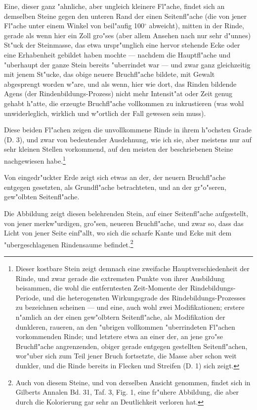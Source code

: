 \documentclass[a4paper, 11pt, oneside, german]{article}
\begin{document}
Eine, dieser ganz "ahnliche, aber ungleich kleinere Fl"ache, findet sich an demselben Steine gegen den unteren Rand der einen Seitenfl"ache (die von jener Fl"ache unter einem Winkel von beil"aufig 100$^{\circ}$ abweicht), mitten in der Rinde, gerade als wenn hier ein Zoll gro"ses (aber allem Ansehen nach nur sehr d"unnes) St"uck der Steinmasse, das etwa urspr"unglich eine hervor stehende Ecke oder eine Erhabenheit gebildet haben mochte --- nachdem die Hauptfl"ache und "uberhaupt der ganze Stein bereits "uberrindet war --- und zwar ganz gleichzeitig mit jenem St"ucke, das obige neuere Bruchfl"ache bildete, mit Gewalt abgesprengt worden w"are, und als wenn, hier wie dort, das Rinden bildende Agens (der Rindenbildungs-Prozess) nicht mehr Intensit"at oder Zeit genug gehabt h"atte, die erzeugte Bruchfl"ache vollkommen zu inkrustieren (was wohl unwiderleglich, wirklich und w"ortlich der Fall gewesen sein muss).

Diese beiden Fl"achen zeigen die unvollkommene Rinde in ihrem h"ochsten Grade (D. 3), und zwar von bedeutender Ausdehnung, wie ich sie, aber meistens nur auf sehr kleinen Stellen vorkommend, auf den meisten der beschriebenen Steine nachgewiesen habe.\footnote{Dieser kostbare Stein zeigt demnach eine zweifache Hauptverschiedenheit der Rinde, und zwar gerade die extremsten Punkte von ihrer Ausbildung beisammen, die wohl die entferntesten Zeit-Momente der Rindebildungs-Periode, und die heterogensten Wirkungsgrade des Rindebildungs-Prozesses zu bezeichnen scheinen --- und eine, auch wohl zwei Modifikationen; erstere n"amlich an der einen gew"olbtern Seitenfl"ache, als Modifikation der dunkleren, raueren, an den "ubrigen vollkommen "uberrindeten Fl"achen vorkommenden Rinde; und letztere etwa an einer der, an jene gro"se Bruchfl"ache angrenzenden, obiger gerade entgegen gestellten Seitenfl"achen, wor"uber sich zum Teil jener Bruch fortsetzte, die Masse aber schon weit dunkler, und die Rinde bereits in Flecken und Streifen (D. 1) sich zeigt.}

Von eingedr"uckter Erde zeigt sich etwas an der, der neuern Bruchfl"ache entgegen gesetzten, als Grundfl"ache betrachteten, und an der gr"o"seren, gew"olbten Seitenfl"ache.

Die Abbildung zeigt diesen belehrenden Stein, auf einer Seitenfl"ache aufgestellt, von jener merkw"urdigen, gro"sen, neueren Bruchfl"ache, und zwar so, dass das Licht von jener Seite einf"allt, wo sich die scharfe Kante und Ecke mit dem "ubergeschlagenen Rindensaume befindet.\footnote{Auch von diesem Steine, und von derselben Ansicht genommen, findet sich in Gilberts Annalen Bd. 31, Taf. 3, Fig. 1, eine fr"uhere Abbildung, die aber durch die Kolorierung gar sehr an Deutlichkeit verloren hat.}
\end{document}
